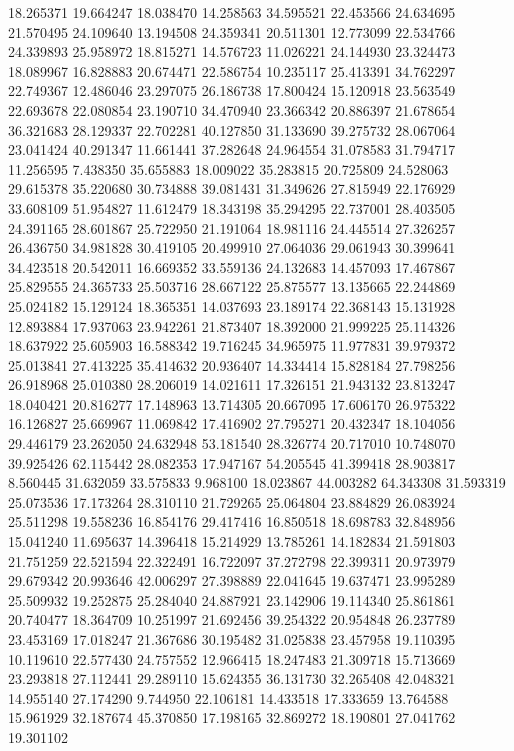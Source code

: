 18.265371
19.664247
18.038470
14.258563
34.595521
22.453566
24.634695
21.570495
24.109640
13.194508
24.359341
20.511301
12.773099
22.534766
24.339893
25.958972
18.815271
14.576723
11.026221
24.144930
23.324473
18.089967
16.828883
20.674471
22.586754
10.235117
25.413391
34.762297
22.749367
12.486046
23.297075
26.186738
17.800424
15.120918
23.563549
22.693678
22.080854
23.190710
34.470940
23.366342
20.886397
21.678654
36.321683
28.129337
22.702281
40.127850
31.133690
39.275732
28.067064
23.041424
40.291347
11.661441
37.282648
24.964554
31.078583
31.794717
11.256595
7.438350
35.655883
18.009022
35.283815
20.725809
24.528063
29.615378
35.220680
30.734888
39.081431
31.349626
27.815949
22.176929
33.608109
51.954827
11.612479
18.343198
35.294295
22.737001
28.403505
24.391165
28.601867
25.722950
21.191064
18.981116
24.445514
27.326257
26.436750
34.981828
30.419105
20.499910
27.064036
29.061943
30.399641
34.423518
20.542011
16.669352
33.559136
24.132683
14.457093
17.467867
25.829555
24.365733
25.503716
28.667122
25.875577
13.135665
22.244869
25.024182
15.129124
18.365351
14.037693
23.189174
22.368143
15.131928
12.893884
17.937063
23.942261
21.873407
18.392000
21.999225
25.114326
18.637922
25.605903
16.588342
19.716245
34.965975
11.977831
39.979372
25.013841
27.413225
35.414632
20.936407
14.334414
15.828184
27.798256
26.918968
25.010380
28.206019
14.021611
17.326151
21.943132
23.813247
18.040421
20.816277
17.148963
13.714305
20.667095
17.606170
26.975322
16.126827
25.669967
11.069842
17.416902
27.795271
20.432347
18.104056
29.446179
23.262050
24.632948
53.181540
28.326774
20.717010
10.748070
39.925426
62.115442
28.082353
17.947167
54.205545
41.399418
28.903817
8.560445
31.632059
33.575833
9.968100
18.023867
44.003282
64.343308
31.593319
25.073536
17.173264
28.310110
21.729265
25.064804
23.884829
26.083924
25.511298
19.558236
16.854176
29.417416
16.850518
18.698783
32.848956
15.041240
11.695637
14.396418
15.214929
13.785261
14.182834
21.591803
21.751259
22.521594
22.322491
16.722097
37.272798
22.399311
20.973979
29.679342
20.993646
42.006297
27.398889
22.041645
19.637471
23.995289
25.509932
19.252875
25.284040
24.887921
23.142906
19.114340
25.861861
20.740477
18.364709
10.251997
21.692456
39.254322
20.954848
26.237789
23.453169
17.018247
21.367686
30.195482
31.025838
23.457958
19.110395
10.119610
22.577430
24.757552
12.966415
18.247483
21.309718
15.713669
23.293818
27.112441
29.289110
15.624355
36.131730
32.265408
42.048321
14.955140
27.174290
9.744950
22.106181
14.433518
17.333659
13.764588
15.961929
32.187674
45.370850
17.198165
32.869272
18.190801
27.041762
19.301102
